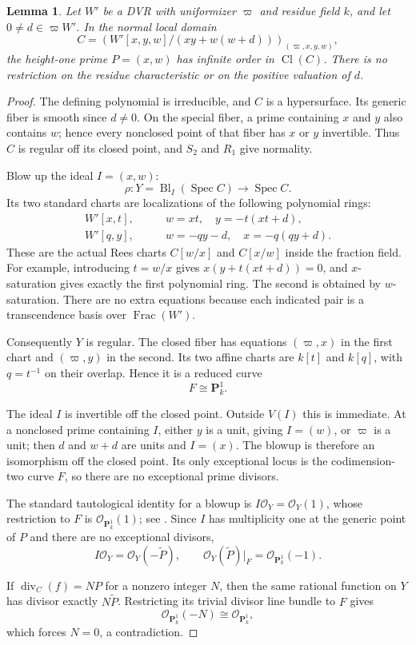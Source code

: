 \documentclass[11pt,a4paper]{amsart}
\numberwithin{equation}{section}
\newtheorem{lemma}[theorem]{Lemma}
\theoremstyle{definition}
\theoremstyle{remark}
\newcommand{\PP}{\mathbf P}
\newcommand{\OO}{\mathcal O}
\newcommand{\Spec}{\operatorname{Spec}}
\newcommand{\Cl}{\operatorname{Cl}}
\newcommand{\Frac}{\operatorname{Frac}}
\newcommand{\divisor}{\operatorname{div}}
\begin{document}
\begin{lemma}\label{d3:lem:smallresolution}
Let $W'$ be a DVR with uniformizer $\varpi$ and residue field $k$, and let $0\neq d\in\varpi W'$. In the normal local domain
\[
C=\left(W'[x,y,w]/(xy+w(w+d))\right)_{(\varpi,x,y,w)},
\]
the height-one prime $P=(x,w)$ has infinite order in $\Cl(C)$. There is no restriction on the residue characteristic or on the positive valuation of $d$.
\end{lemma}
\begin{proof}
The defining polynomial is irreducible, and $C$ is a hypersurface. Its generic fiber is smooth since $d\neq0$. On the special fiber, a prime containing $x$ and $y$ also contains $w$; hence every nonclosed point of that fiber has $x$ or $y$ invertible. Thus $C$ is regular off its closed point, and $S_2$ and $R_1$ give normality.

Blow up the ideal $I=(x,w)$:
\[
\rho:Y=\operatorname{Bl}_{I}(\Spec C)\longrightarrow\Spec C.
\]
Its two standard charts are localizations of the following polynomial rings:
\begin{align*}
W'[x,t],&\qquad w=xt,\quad y=-t(xt+d),\\
W'[q,y],&\qquad w=-qy-d,\quad x=-q(qy+d).
\end{align*}
These are the actual Rees charts $C[w/x]$ and $C[x/w]$ inside the fraction field. For example, introducing $t=w/x$ gives $x(y+t(xt+d))=0$, and $x$-saturation gives exactly the first polynomial ring. The second is obtained by $w$-saturation. There are no extra equations because each indicated pair is a transcendence basis over $\Frac(W')$.

Consequently $Y$ is regular. The closed fiber has equations $(\varpi,x)$ in the first chart and $(\varpi,y)$ in the second. Its two affine charts are $k[t]$ and $k[q]$, with $q=t^{-1}$ on their overlap. Hence it is a reduced curve
\[
F\cong\PP^1_k.
\]

The ideal $I$ is invertible off the closed point. Outside $V(I)$ this is immediate. At a nonclosed prime containing $I$, either $y$ is a unit, giving $I=(w)$, or $\varpi$ is a unit; then $d$ and $w+d$ are units and $I=(x)$. The blowup is therefore an isomorphism off the closed point. Its only exceptional locus is the codimension-two curve $F$, so there are no exceptional prime divisors.

The standard tautological identity for a blowup is $I\OO_Y=\OO_Y(1)$, whose restriction to $F$ is $\OO_{\PP^1_k}(1)$; see \cite[Lemma~31.33.4, Tag~02OS]{StacksBlowup}. Since $I$ has multiplicity one at the generic point of $P$ and there are no exceptional divisors,
\[
I\OO_Y=\OO_Y(-\widetilde P),\qquad
\OO_Y(\widetilde P)|_F=\OO_{\PP^1_k}(-1).
\]

If $\divisor_C(f)=NP$ for a nonzero integer $N$, then the same rational function on $Y$ has divisor exactly $N\widetilde P$. Restricting its trivial divisor line bundle to $F$ gives
\[
\OO_{\PP^1_k}(-N)\cong\OO_{\PP^1_k},
\]
which forces $N=0$, a contradiction.
\end{proof}
\end{document}
